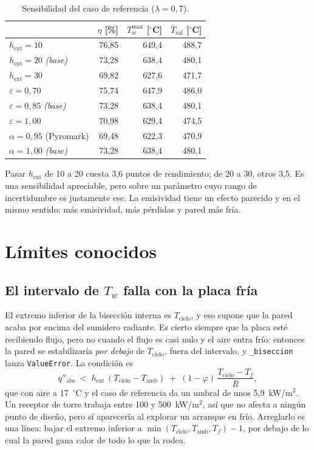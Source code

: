 \documentclass[11pt,a4paper]{article}
\begin{document}
\begin{table}[h]
\centering
\begin{tabular}{lrrr}
  \toprule
  & $\eta$ [\%] & $T_w^{\max}$ [$^\circ$C] & $\bar{T}_{\mathrm{sal}}$ [$^\circ$C] \\
  \midrule
  $h_{\mathrm{ext}} = 10$              & 76,85 & 649,4 & 488,7 \\
  $h_{\mathrm{ext}} = 20$ \emph{(base)}& 73,28 & 638,4 & 480,1 \\
  $h_{\mathrm{ext}} = 30$              & 69,82 & 627,6 & 471,7 \\
  \midrule
  $\varepsilon = 0{,}70$               & 75,74 & 647,9 & 486,0 \\
  $\varepsilon = 0{,}85$ \emph{(base)} & 73,28 & 638,4 & 480,1 \\
  $\varepsilon = 1{,}00$               & 70,98 & 629,4 & 474,5 \\
  \midrule
  $\alpha = 0{,}95$ (Pyromark)         & 69,48 & 622,3 & 470,9 \\
  $\alpha = 1{,}00$ \emph{(base)}      & 73,28 & 638,4 & 480,1 \\
  \bottomrule
\end{tabular}
\caption{Sensibilidad del caso de referencia ($\lambda = 0{,}7$).}
\label{tab:sensib}
\end{table}

Pasar $h_{\mathrm{ext}}$ de 10 a 20 cuesta 3,6 puntos de rendimiento; de 20 a
30, otros 3,5. Es una sensibilidad apreciable, pero sobre un parámetro cuyo rango
de incertidumbre es justamente ese. La emisividad tiene un efecto parecido y en
el mismo sentido: más emisividad, más pérdidas y pared más fría.

\section{Límites conocidos}

\subsection{El intervalo de \texorpdfstring{$T_w$}{T\_w} falla con la placa fría}
\label{sec:fallo}

El extremo inferior de la bisección interna es $T_{\mathrm{cielo}}$, y eso
supone que la pared acaba por encima del sumidero radiante. Es cierto siempre
que la placa esté recibiendo flujo, pero no cuando el flujo es casi nulo y el
aire entra frío: entonces la pared se estabilizaría \emph{por debajo} de
$T_{\mathrm{cielo}}$, fuera del intervalo, y \texttt{\_biseccion} lanza
\texttt{ValueError}. La condición es
\[
  q''_{\mathrm{abs}} \;<\; h_{\mathrm{ext}}\,(T_{\mathrm{cielo}} - T_{\mathrm{amb}})
  \;+\; (1 - \varphi)\,\frac{T_{\mathrm{cielo}} - T_f}{R},
\]
que con aire a 17~$^\circ$C y el caso de referencia da un umbral de unos
5,9~kW/m$^2$. Un receptor de torre trabaja entre 100 y 500~kW/m$^2$, así que no
afecta a ningún punto de diseño, pero sí aparecería al explorar un arranque en
frío. Arreglarlo es una línea: bajar el extremo inferior a
$\min(T_{\mathrm{cielo}}, T_{\mathrm{amb}}, T_f) - 1$, por debajo de lo cual la
pared gana calor de todo lo que la rodea.
\end{document}
